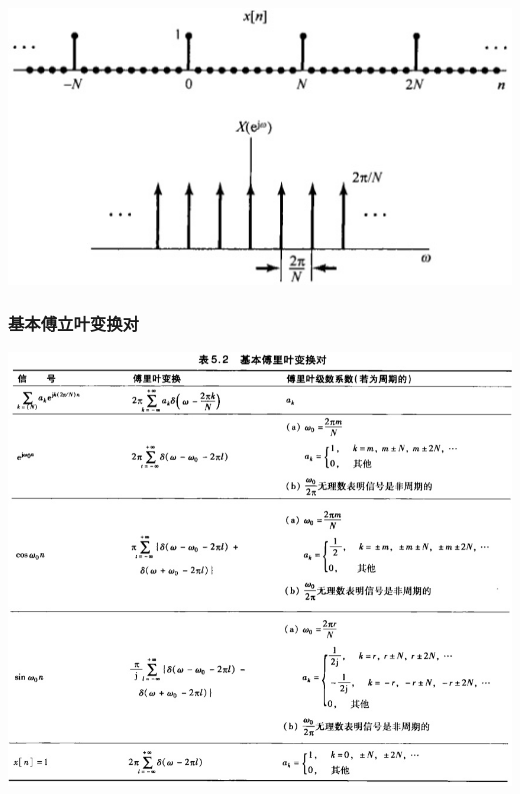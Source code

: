 \documentclass[CJKutf8,dvipsnames,table]{beamer}
\begin{document}
\begin{CJK*}{UTF8}{song}
\begin{frame}
\begin{itemize}
    	\begin{center}
    	\includegraphics[scale=.35]{ss-c-f5-11}
    	\end{center}
    \end{itemize}

  \end{frame}    
    
  \begin{frame}
    \frametitle{基本傅立叶变换对}
    \begin{center}
      \includegraphics[scale=.32]{ss-c-t5-2a}
    \end{center}
  \end{frame}  
   

\end{CJK*}
\end{document}
